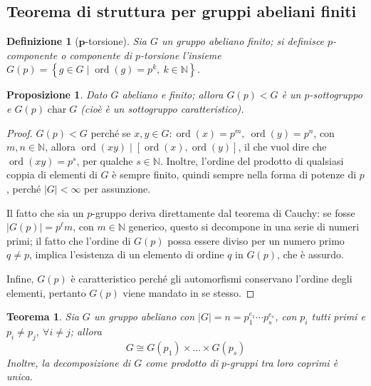 \documentclass[12pt]{scrartcl}
\theoremstyle{style}
\newtheorem{definizione}{Definizione}[section]
\newtheorem{prop}{Proposizione}[section]
\newtheorem{teorema}{Teorema}[section]
\numberwithin{equation}{subsection}
\begin{document}
\subsection{Teorema di struttura per gruppi abeliani finiti}
\begin{definizione}
	[$\mathbf{p}$-torsione]
Sia $G$ un gruppo abeliano finito; si definisce \textit{$p$-componente} o \textit{componente di $p$-torsione} l'insieme $G(p) = \left\{ g \in  G  \mid \operatorname{ord}(g) =p^k, \ k \in \mathbb{N} \right\} $.
\end{definizione}
\begin{prop}
	Dato $G$ abeliano e finito; allora $G(p) < G$ \`e un $p$-sottogruppo e $G(p) \operatorname{char} G$ (cio\`e \`e un sottogruppo caratteristico).
\end{prop}
	\begin{proof}
		$G(p) < G$ perch\'e se $x,y \in G : \operatorname{ord}(x) =p^m,\  \operatorname{ord}(y) =p^n$, con $m,n \in \mathbb{N}$, allora $\operatorname{ord}(xy)  \mid [\operatorname{ord}(x) , \operatorname{ord}(y) ]$, il che vuol dire che $\operatorname{ord}(xy) = p^s$, per qualche $s \in  \mathbb{N}$.
		Inoltre, l'ordine del prodotto di qualsiasi coppia di elementi di $G$ \`e sempre finito, quindi sempre nella forma di potenze di $p$, perch\'e $\lvert G \rvert < \infty$ per assunzione.

		Il fatto che sia un $p$-gruppo deriva direttamente dal teorema di Cauchy: se fosse $\lvert G(p) \rvert = p^\ell m $, con $m \in \mathbb{N}$ generico, questo si decompone in una serie di numeri primi; il fatto che l'ordine di $G(p)$ possa essere diviso per un numero primo $q\neq p$, implica l'esistenza di un elemento di ordine $q$ in $G(p)$, che \`e assurdo.

		Infine, $G(p)$ \`e caratteristico perch\'e gli automorfismi conservano l'ordine degli elementi, pertanto $G(p)$ viene mandato in se stesso.
	\end{proof}
\begin{teorema}\label{corts1}
	Sia $G$ un gruppo abeliano con $\lvert G \rvert = n = p_1^{e_1} \cdots p_s^{e_s}$, con $p_i$ tutti primi e $p_i\neq p_j, \ \forall i\neq j$; allora
	\[
	G \cong G(p_1) \times \ldots\times  G(p_s)
	\] 
	Inoltre, la decomposizione di $G$ come prodotto di $p$-gruppi tra loro coprimi \`e unica.
\end{teorema}
\end{document}
